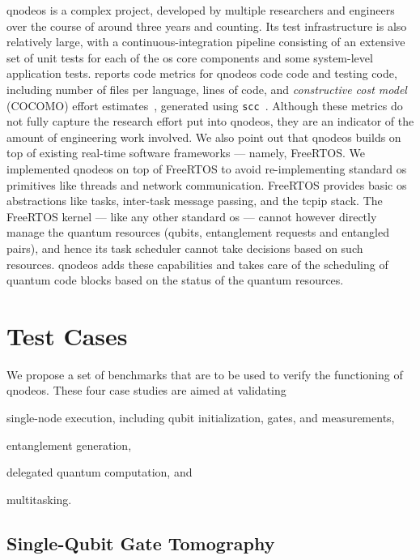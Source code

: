 \acrshort{qnodeos} is a complex project, developed by multiple researchers and engineers over the
course of around three years and counting. Its test infrastructure is also relatively large, with a
continuous-integration pipeline consisting of an extensive set of unit tests for each of the
\acrshort{os} core components and some system-level application tests. 
reports code metrics for \acrshort{qnodeos} code code and testing code, including number of files
per language, lines of code, and \emph{constructive cost model} (COCOMO) effort
estimates~\cite{boehm_2009}, generated using \texttt{scc}~\cite{scc}. Although these metrics do not
fully capture the research effort put into \acrshort{qnodeos}, they are an indicator of the amount
of engineering work involved. We also point out that \acrshort{qnodeos} builds on top of existing
real-time software frameworks --- namely, FreeRTOS. We implemented \acrshort{qnodeos} on top of
FreeRTOS to avoid re-implementing standard \acrshort{os} primitives like threads and network
communication. FreeRTOS provides basic \acrshort{os} abstractions like tasks, inter-task message
passing, and the \acrshort{tcpip} stack. The FreeRTOS kernel --- like any other standard
\acrshort{os} --- cannot however directly manage the quantum resources (qubits, entanglement
requests and entangled pairs), and hence its task scheduler cannot take decisions based on such
resources. \acrshort{qnodeos} adds these capabilities and takes care of the scheduling of quantum
code blocks based on the status of the quantum resources.

\section{Test Cases}
\label{sec:qnodeos:evaluation}

We propose a set of benchmarks that are to be used to verify the functioning of \acrshort{qnodeos}.
These four case studies are aimed at validating
\begin{inlinelist}
    \item single-node execution, including qubit initialization, gates, and measurements,
    \item entanglement generation,
    \item delegated quantum computation, and
    \item multitasking.
\end{inlinelist}

\subsection{Single-Qubit Gate Tomography}

